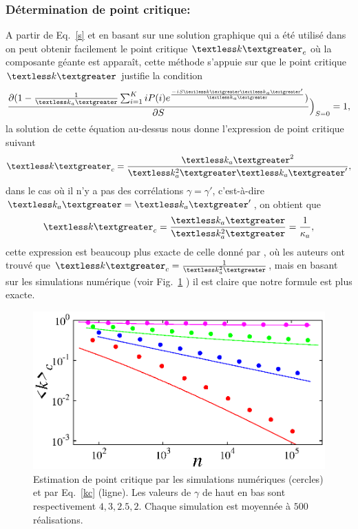  \subsubsection{Détermination de point critique:}
 A partir de Eq.~\ref{s} et en basant sur une solution graphique qui a été utilisé dans \cite{Newman2010-403} on peut obtenir facilement le point critique $\km_c$ où la composante géante  est apparaît, cette méthode s'appuie sur que le point critique $\km$ justifie la condition 
 \begin{equation}
 \frac{\partial (1-\frac{1}{\kma}\sum_{i=1}^KiP(i)e^{\frac{-iS\km\kma'}{\kma}})}{\partial S}\Big)_{S=0}=1,
 \end{equation}
 la solution de cette équation au-dessus nous donne l'expression de point critique suivant
 \begin{equation}
\km_c=\frac{\kma^2}{\kmaa\kma'},
 \end{equation}
 dans le cas où il n'y a pas des corrélations $\gamma=\gamma'$, c'est-à-dire $\kma=\kma'$, on obtient que
  \begin{equation}
  \km_c=\frac{\kma}{\kmaa}=\frac{1}{\kappa_a},
  \label{kc}
  \end{equation}
   cette expression est beaucoup plus exacte de celle donné par \cite{Cho-al2010}, où les auteurs ont trouvé que $\km_c=\frac{1}{\kmaa}$, mais en basant sur les simulations numérique (voir Fig.~\ref{PC} ) il est claire que notre formule est plus exacte.\\
\begin{figure}[h!]
	\centering
	\includegraphics[scale=1.2]{./figures/fig-PC}
	\caption{Estimation de point critique par les simulations numériques (cercles) et par Eq.~\ref{kc} (ligne). Les valeurs de $\gamma$ de haut en bas sont respectivement $4,3,2.5,2$. Chaque simulation est moyennée à $500$ réalisations. }
	\label{PC}
\end{figure}

